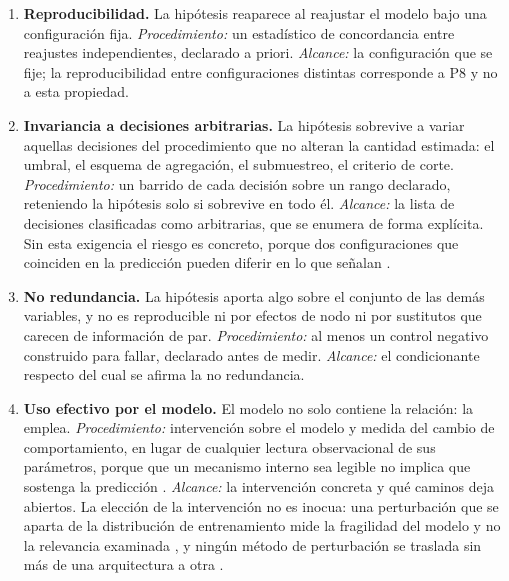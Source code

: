 \begin{enumerate}[itemsep=3pt, leftmargin=2.2em, label=\textbf{P\arabic*.}]

\item \textbf{Reproducibilidad.} La hipótesis reaparece al reajustar el modelo bajo una configuración fija. \emph{Procedimiento:} un estadístico de concordancia entre reajustes independientes, declarado a priori. \emph{Alcance:} la configuración que se fije; la reproducibilidad entre configuraciones distintas corresponde a P8 y no a esta propiedad.

\item \textbf{Invariancia a decisiones arbitrarias.} La hipótesis sobrevive a variar aquellas decisiones del procedimiento que no alteran la cantidad estimada: el umbral, el esquema de agregación, el submuestreo, el criterio de corte. \emph{Procedimiento:} un barrido de cada decisión sobre un rango declarado, reteniendo la hipótesis solo si sobrevive en todo él. \emph{Alcance:} la lista de decisiones clasificadas como arbitrarias, que se enumera de forma explícita. Sin esta exigencia el riesgo es concreto, porque dos configuraciones que coinciden en la predicción pueden diferir en lo que señalan \cite{bogaert2026variability}.

\item \textbf{No redundancia.} La hipótesis aporta algo sobre el conjunto de las demás variables, y no es reproducible ni por efectos de nodo ni por sustitutos que carecen de información de par. \emph{Procedimiento:} al menos un control negativo construido para fallar, declarado antes de medir. \emph{Alcance:} el condicionante respecto del cual se afirma la no redundancia.

\item \textbf{Uso efectivo por el modelo.} El modelo no solo contiene la relación: la emplea. \emph{Procedimiento:} intervención sobre el modelo y medida del cambio de comportamiento, en lugar de cualquier lectura observacional de sus parámetros, porque que un mecanismo interno sea legible no implica que sostenga la predicción \cite{rizzo2022faithfulness}. \emph{Alcance:} la intervención concreta y qué caminos deja abiertos. La elección de la intervención no es inocua: una perturbación que se aparta de la distribución de entrenamiento mide la fragilidad del modelo y no la relevancia examinada \cite{meng2023perturbation}, y ningún método de perturbación se traslada sin más de una arquitectura a otra \cite{simic2025perturbation}.


\end{enumerate}
